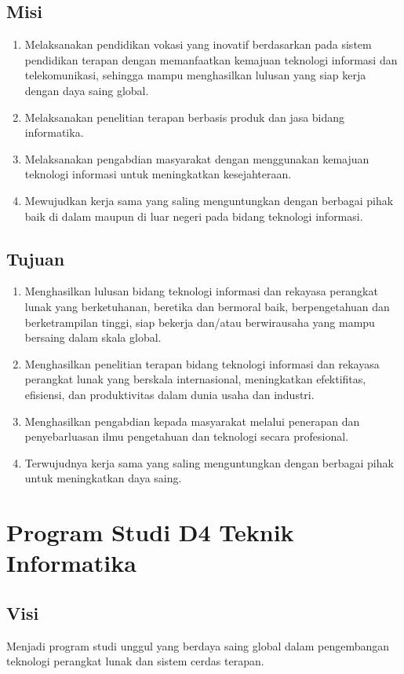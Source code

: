 \subsection{Misi}
\begin{enumerate}
\item Melaksanakan pendidikan vokasi yang inovatif berdasarkan pada sistem pendidikan terapan dengan memanfaatkan kemajuan teknologi informasi dan telekomunikasi, sehingga mampu menghasilkan lulusan yang siap kerja dengan daya saing global.
\item Melaksanakan penelitian terapan berbasis produk dan jasa bidang informatika.
\item Melaksanakan pengabdian masyarakat dengan menggunakan kemajuan teknologi informasi untuk meningkatkan kesejahteraan.
\item Mewujudkan kerja sama yang saling menguntungkan dengan berbagai pihak baik di dalam maupun di luar negeri pada bidang teknologi informasi.
\end{enumerate}

\subsection{Tujuan}
\begin{enumerate}
\item Menghasilkan lulusan bidang teknologi informasi dan rekayasa perangkat lunak yang berketuhanan, beretika dan bermoral baik, berpengetahuan dan berketrampilan tinggi, siap bekerja dan/atau berwirausaha yang mampu bersaing dalam skala global.
\item Menghasilkan penelitian terapan bidang teknologi informasi dan rekayasa perangkat lunak yang berskala internasional, meningkatkan efektifitas, efisiensi, dan produktivitas dalam dunia usaha dan industri.
\item Menghasilkan pengabdian kepada masyarakat melalui penerapan dan penyebarluasan ilmu pengetahuan dan teknologi secara profesional.
\item Terwujudnya kerja sama yang saling menguntungkan dengan berbagai pihak untuk meningkatkan daya saing.
\end{enumerate}

\section{Program Studi D4 Teknik Informatika}

\subsection{Visi}
Menjadi program studi unggul yang berdaya saing global dalam pengembangan teknologi perangkat lunak dan sistem cerdas terapan.

